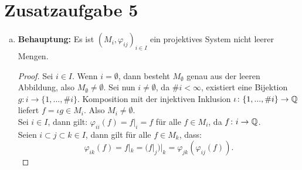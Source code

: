 \documentclass{nico_zettelsose21}
\begin{document}
\section*{Zusatzaufgabe 5}
\begin{enumerate}[(a)]
    \item   \textbf{Behauptung:} Es ist $(M_{i},\varphi_{ij})_{i \in I}$ ein projektives System nicht leerer Mengen.
            \begin{proof}
                Sei $i \in I$. Wenn $i = \emptyset$, dann besteht $M_{\emptyset}$ genau aus der leeren Abbildung, also $M_{\emptyset} \neq \emptyset$.
                Sei nun $i \neq \emptyset$, da $\# i < \infty$, existiert eine Bijektion $g \colon i \to \{1,...,\# i\}$. Komposition 
                mit der injektiven Inklusion $\iota \colon \{1,...,\# i\} \to \mathbb{Q}$ liefert $f = \iota g \in M_{i}$. Also $M_{i} \neq \emptyset$. \\
                Sei $i \in I$, dann gilt: $\varphi_{ii}(f) = f|_{i} = f$ für alle $f \in M_{i}$, da $f \colon i \to \mathbb{Q}$. \\
                Seien $i \subset j \subset k \in I$, dann gilt für alle $f \in M_{k}$, dass:
                \[
                    \varphi_{ik}(f) = f|_{k} = (f|_{j})|_{k} = \varphi_{jk}(\varphi_{ij}(f)).
                \]
            \end{proof}
\end{enumerate}
\end{document}
